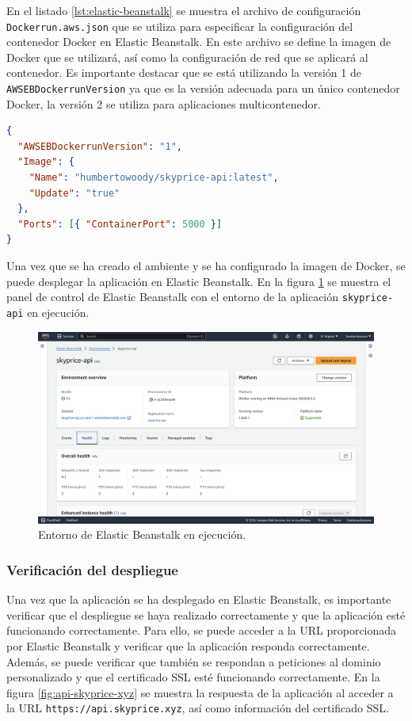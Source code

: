 En el listado \ref{lst:elastic-beanstalk} se muestra el archivo de configuración
\texttt{Dockerrun.aws.json} que se utiliza para especificar la configuración del
contenedor Docker en Elastic Beanstalk. En este archivo se define la imagen de Docker
que se utilizará, así como la configuración de red que se aplicará al contenedor.
Es importante destacar que se está utilizando la versión 1 de \texttt{AWSEBDockerrunVersion}
ya que es la versión adecuada para un único contenedor Docker, la versión 2 se utiliza
para aplicaciones multicontenedor.

\begin{lstlisting}[language=json, caption={Archivo de configuración para Elastic Beanstalk}, label={lst:elastic-beanstalk}]
{
  "AWSEBDockerrunVersion": "1",
  "Image": {
    "Name": "humbertowoody/skyprice-api:latest",
    "Update": "true"
  },
  "Ports": [{ "ContainerPort": 5000 }]
}
\end{lstlisting}

Una vez que se ha creado el ambiente y se ha configurado la imagen de Docker, se
puede desplegar la aplicación en Elastic Beanstalk. En la figura \ref{fig:elastic-beanstalk}
se muestra el panel de control de Elastic Beanstalk con el entorno de la aplicación
\texttt{skyprice-api} en ejecución.

\begin{figure}[H]
    \centering
    \includegraphics[width=1.0\textwidth]{imagenes/05-implementacion/despliegue/eb-skyprice-api-main.png}
    \caption{Entorno de Elastic Beanstalk en ejecución.}
    \label{fig:elastic-beanstalk}
\end{figure}

\subsubsection{Verificación del despliegue}
Una vez que la aplicación se ha desplegado en Elastic Beanstalk, es importante
verificar que el despliegue se haya realizado correctamente y que la aplicación
esté funcionando correctamente. Para ello, se puede acceder a la URL proporcionada
por Elastic Beanstalk y verificar que la aplicación responda correctamente. Además,
se puede verificar que también se respondan a peticiones al dominio personalizado y
que el certificado SSL esté funcionando correctamente. En la figura \ref{fig:api-skyprice-xyz}
se muestra la respuesta de la aplicación al acceder a la URL \texttt{https://api.skyprice.xyz},
así como información del certificado SSL.


